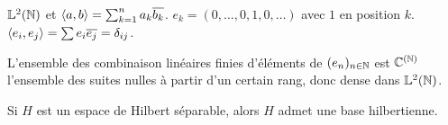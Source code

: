 \begin{example}
	$\mathbb{L}^2(\mathbb{N})$  et $\left\langle a, b \right\rangle = \sum_{k=1}^n a_k \overline{b_k}$.
	$e_k = (0, \ldots, 0, 1, 0, \ldots)$ avec $1$ en position $k$.
	$\left\langle e_i, e_j \right\rangle = \sum e_i \overline{e_j} = \delta_{ij}$.

	L'ensemble des combinaison linéaires finies d'éléments de $(e_n)_{n\in \mathbb{N}}$ est $\mathbb{C}^{(\mathbb{N})}$ l'ensemble des suites nulles à partir d'un certain rang, donc dense dans $\mathbb{L}^2(\mathbb{N})$.
\end{example}

\begin{example}
\end{example}


\begin{theorem}
	Si $H$ est un espace de Hilbert séparable, alors $H$ admet une base hilbertienne.
\end{theorem}


